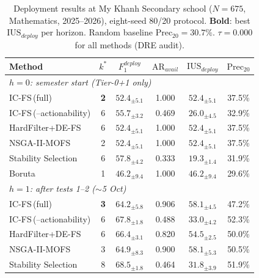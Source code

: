 \documentclass[a4paper,fleqn]{cas-sc}
\begin{document}
\begin{table}[t]
  \centering
  \small
  \caption{Deployment results at My Khanh Secondary school ($N=675$,
    Mathematics, 2025--2026), eight-seed 80/20 protocol.
    \textbf{Bold}: best $\mathrm{IUS}_{deploy}$ per horizon.
    Random baseline $\mathrm{Prec}_{20} = 30.7\%$.
    $\tau = 0.000$ for all methods (DRE audit).}
  \label{tab:thcsmk}
  \setlength{\tabcolsep}{4pt}
  \renewcommand{\arraystretch}{1.05}
  \begin{tabular}{lc ccc c}
    \toprule
    Method & $k^*$
           & $F^{deploy}_1$
           & $\mathrm{AR}_{avail}$
           & $\mathrm{IUS}_{deploy}$
           & $\mathrm{Prec}_{20}$ \\
    \midrule
    \multicolumn{6}{l}{\textit{$h=0$: semester start (Tier-0+1 only)}} \\[2pt]
    IC-FS\,(full)            & \textbf{2} & $52.4_{\pm 5.1}$ & 1.000 & \textbf{$52.4_{\pm 5.1}$} & 37.5\% \\
    IC-FS\,(--actionability) & 6          & $55.7_{\pm 3.2}$ & 0.469 & $26.0_{\pm 4.5}$          & 32.9\% \\
    HardFilter+DE-FS         & 6          & $52.4_{\pm 5.1}$ & 1.000 & $52.4_{\pm 5.1}$          & 37.5\% \\
    NSGA-II-MOFS             & 2          & $52.4_{\pm 5.1}$ & 1.000 & $52.4_{\pm 5.1}$          & 37.5\% \\
    Stability Selection      & 6          & $57.8_{\pm 4.2}$ & 0.333 & $19.3_{\pm 1.4}$          & 31.9\% \\
    Boruta                   & 1          & $46.2_{\pm 9.4}$ & 1.000 & $46.2_{\pm 9.4}$          & 29.6\% \\
    \midrule
    \multicolumn{6}{l}{\textit{$h=1$: after tests 1--2 (${\sim}$5 Oct)}} \\[2pt]
    IC-FS\,(full)            & \textbf{3} & $64.2_{\pm 5.8}$ & 0.906 & \textbf{$58.1_{\pm 4.5}$} & 47.2\% \\
    IC-FS\,(--actionability) & 6          & $67.8_{\pm 1.8}$ & 0.488 & $33.0_{\pm 4.2}$          & 52.3\% \\
    HardFilter+DE-FS         & 6          & $66.4_{\pm 3.1}$ & 0.820 & $54.5_{\pm 2.5}$          & 50.0\% \\
    NSGA-II-MOFS             & 3          & $64.9_{\pm 8.3}$ & 0.900 & $58.1_{\pm 5.3}$          & 50.5\% \\
    Stability Selection      & 8          & $68.5_{\pm 1.8}$ & 0.464 & $31.8_{\pm 3.9}$          & 51.9\% \\

\end{tabular}
\end{table}
\end{document}
